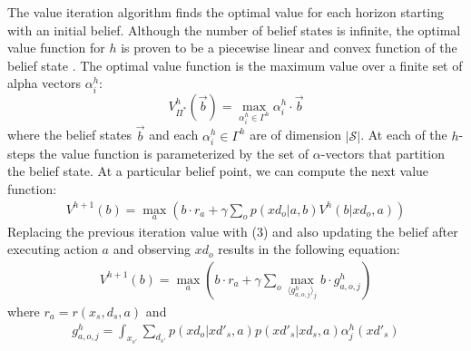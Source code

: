 \documentclass{article}
\begin{document}
The value iteration algorithm finds the optimal value for each horizon starting with an initial belief. Although the number of belief states is infinite, the optimal value function for $h$ is proven to be a piecewise linear and convex function of the belief state \cite{smallwoodSondik}. The optimal value function is the maximum value over a finite set of alpha vectors  $\alpha^h_i$:%
\begin{equation}
V^h_{\Pi^*}(\vec{b}) = \max_{\alpha^h_i \in \Gamma^h} \alpha^h_i \cdot \vec{b}
\end{equation}
where the belief states $\vec{b}$ and each $\alpha^h_i \in \Gamma^h$ are of dimension $|\mathcal{S}|$. At each of the $h$-steps the value function is parameterized by the set of  $\alpha$-vectors that partition the belief state. 
At a particular belief point, we can compute the next value function: 
\begin{align*}
V^{h+1}(b) = \max_a \left( b \cdot r_a + \gamma \sum_o p(xd_o|a,b)V^h(b|xd_o,a)\right)\nonumber
\end{align*}
Replacing the previous iteration value with (3) and also updating the belief after executing action $a$ and observing $xd_o$ results in the following equation: 
\begin{align*}
V^{h+1}(b) = \max_a \left( b \cdot r_a + 
\gamma \sum_o \max_{\langle g^h_{a,o,j} \rangle_j}  b \cdot g^h_{a,o,j} \right)\nonumber
\end{align*}
where $r_a = r(x_s,d_s,a)$ and  
\begin{align}
g^h_{a,o,j} =  \int_{x_{s'}} \sum_{d_{s'}} p(xd_o|xd'_s,a)p(xd'_s|xd_s,a) \alpha^h_j(xd'_s)
\end{align}
\end{document}
